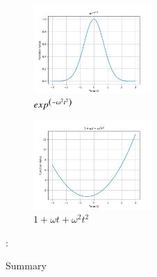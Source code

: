 \documentclass[journal,12pt,twocolumn]{IEEEtran}
\theoremstyle{remark}
\begin{document}
\begin{figure}[h!]
    \centering
    \includegraphics[width=0.4\textwidth]{figs/a1_fig5.png}
    \caption{$exp^{\left(-\omega^2 t^2\right)}$}
\end{figure}
\begin{figure}[h!]
    \centering
    \includegraphics[width=0.4\textwidth]{figs/a1_fig6.png}
    \caption{$1+\omega t+\omega^2 t^2$}
\end{figure}
\newpage
\begin{flushleft}
  \begin{table}[h]
   \def\arraystretch{1.5}:
   \caption{Summary}
   \label{tab:table.11.14-4}
   
  \end{table}
 \end{flushleft}
\end{document}
